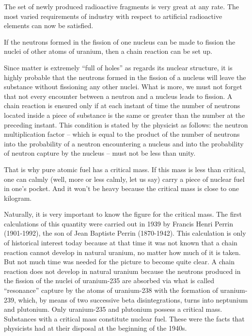 The set of newly produced radioactive fragments is very great at any rate. The most varied requirements of industry with respect to artificial radioactive elements can now be satisfied.

If the neutrons formed in the fission of one nucleus can be made to fission the nuclei of other atoms of urani­um, then a chain reaction can be set up.

Since matter is extremely ``full of holes'' as regards its nuclear structure, it is highly probable that the neu­trons formed in the fission of a nucleus will leave the substance without fissioning any other nuclei. What is more, we must not forget that not every encounter between a neutron and a nucleus leads to fission. A chain reaction is ensured only if at each instant of time the number of neutrons located inside a piece of substance is the same or greater than the number at the preceding instant. This condition is stated by the physicist as follows: the neutron multiplication factor -- which is equal to the product of the number of neutrons into the proba­bility of a neutron encountering a nucleus and into the probability of neutron capture by the nucleus -- must not be less than unity.

That is why pure atomic fuel has a critical mass. If this mass is less than critical, one can calmly (well, more or less calmly, let us say) carry a piece of nuclear fuel in one’s pocket. And it won’t be heavy because the critical mass is close to one kilogram.

Naturally, it is very important to know the figure for the critical mass. The first calculations of this quantity were carried out in 1939 by Francis Henri Perrin (1901-1992), the son of Jean Baptiste Perrin (1870-1942). This cal­culation is only of historical interest today because at that time it was not known that a chain reaction cannot develop in natural uranium, no matter how much of it is taken. But not much time was needed for the picture to become quite clear. A chain reaction does not develop in natural uranium because the neutrons produced in the fission of the nuclei of uranium-235 are absorbed via what is called ``resonance'' capture by the atoms of urani­um-238 with the formation of uranium-239, which, by means of two successive beta disintegrations, turns into neptunium and plutonium. Only uranium-235 and plu­tonium possess a critical mass. Substances with a critical mass constitute nuclear fuel. These were the facts that physicists had at their disposal at the beginning of the 1940s.

